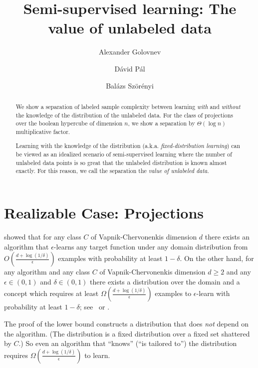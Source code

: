 \documentclass[10pt]{article}
\begin{document}
\title{Semi-supervised learning: The value of unlabeled data}
\author{Alexander Golovnev \and D\'avid P\'al \and Bal\'azs Sz\"or\'enyi}

\maketitle

\begin{abstract}
We show a separation of labeled sample complexity between learning \emph{with}
and \emph{without} the knowledge of the distribution of the unlabeled data. For
the class of projections over the boolean hypercube of dimension $n$, we show a
separation by $\Theta(\log n)$ multiplicative factor.

Learning with the knowledge of the distribution (a.k.a. \emph{fixed-distribution
learning}) can be viewed as an idealized scenario of semi-supervised learning
where the number of unlabeled data points is so great that the unlabeled
distribution is known almost exactly. For this reason, we call the separation
the \emph{value of unlabeled data}.
\end{abstract}


\section{Realizable Case: Projections}

\cite{Hanneke-2016} showed that for any class $C$ of Vapnik-Chervonenkis
dimension $d$ there exists an algorithm that $\epsilon$-learns any target
function under any domain distribution  from $O\left(\frac{d +
\log(1/\delta)}{\epsilon}\right)$ examples with probability at least $1-\delta$.
On the other hand, for any algorithm and any class $C$ of Vapnik-Chervonenkis dimension
$d \ge 2$ and any $\epsilon \in (0,1)$ and $\delta \in (0,1)$ there exists a
distribution over the domain and a concept which requires at least $\Omega
\left(\frac{d + \log(1/\delta)}{\epsilon}\right)$ examples to $\epsilon$-learn
with probability at least $1 - \delta$; see~\cite[Theorem
5.3]{Anthony-Bartlett-1999} or \cite{Blumer-Ehrenfeucht-Haussler-Warmuth-1989,
Ehrenfeucht-Haussler-Kearns-Valiant-1989}.

The proof of the lower bound constructs a distribution that does \emph{not}
depend on the algorithm. (The distribution is a fixed distribution over a
fixed set shattered by $C$.) So even an algorithm that ``knows'' (``is tailored
to'') the distribution requires $\Omega \left(\frac{d +
\log(1/\delta)}{\epsilon}\right)$ to learn.
\end{document}
